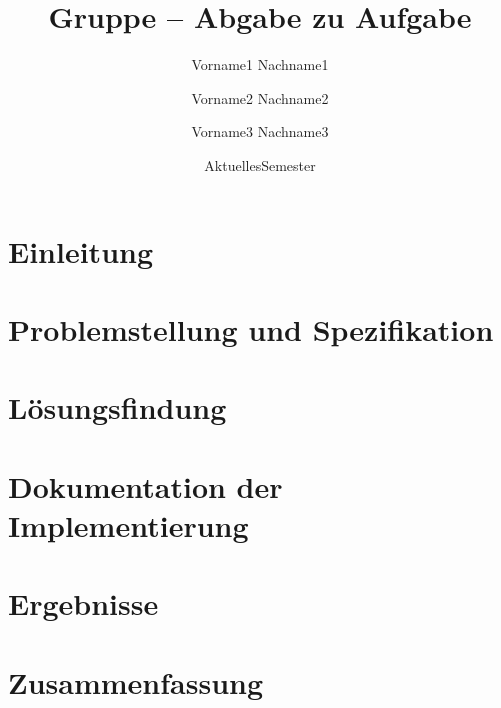 \documentclass[course=erap]{aspdoc}
\author{Vorname1 Nachname1 \and Vorname2 Nachname2 \and Vorname3 Nachname3}
\date{AktuellesSemester} %
\title{Gruppe \theGroup{} -- Abgabe zu Aufgabe \theNumber}
\begin{document}
\maketitle

\section{Einleitung}


\section{Problemstellung und Spezifikation}


\section{Lösungsfindung}


\section{Dokumentation der Implementierung}


\section{Ergebnisse}


\section{Zusammenfassung}
\end{document}
